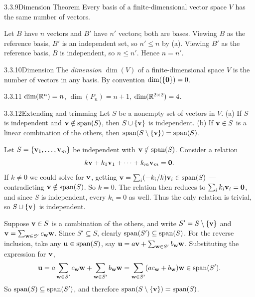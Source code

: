 \begin{thms}{3.3.9}{Dimension Theorem}
Every basis of a finite-dimensional vector space $V$ has the same number of vectors.
\end{thms}

\begin{prf}
Let $B$ have $n$ vectors and $B'$ have $n'$ vectors; both are bases. Viewing $B$ as the reference basis, $B'$ is an independent set, so $n'\le n$ by (a). Viewing $B'$ as the reference basis, $B$ is independent, so $n\le n'$. Hence $n=n'$.
\end{prf}

\begin{defns}{3.3.10}{Dimension}
The \emph{dimension} $\dim(V)$ of a finite-dimensional space $V$ is the number of vectors in any basis. By convention $\operatorname{dim}(\{\mathbf{0}\})=0$.
\end{defns}

\begin{exmp}{3.3.11}{}
$\operatorname{dim}(\mathbb{R}^n)=n$, \quad $\dim(P_n)=n+1$, \quad $\operatorname{dim}(\mathbb{R}^{2\times2})=4$.
\end{exmp}

\begin{thms}{3.3.12}{Extending and trimming}
Let $S$ be a nonempty set of vectors in $V$.
\textup{(a)} If $S$ is independent and $\mathbf{v}\notin\operatorname{span}(S)$, then $S\cup\{\mathbf{v}\}$ is independent.
\textup{(b)} If $\mathbf{v}\in S$ is a linear combination of the others, then $\operatorname{span}(S\setminus\{\mathbf{v}\})=\operatorname{span}(S)$.
\end{thms}

\begin{prf}
 Let $S=\{\mathbf{v}_1,\dots,\mathbf{v}_m\}$ be independent with $\mathbf{v}\notin\operatorname{span}(S)$. Consider a relation
\[
k\mathbf{v}+k_1\mathbf{v}_1+\cdots+k_m\mathbf{v}_m=\mathbf{0}.
\]
If $k\neq0$ we could solve for $\mathbf{v}$, getting $\mathbf{v}=\sum_i(-k_i/k)\mathbf{v}_i\in\operatorname{span}(S)$ --- contradicting $\mathbf{v}\notin\operatorname{span}(S)$. So $k=0$. The relation then reduces to $\sum_i k_i\mathbf{v}_i=\mathbf{0}$, and since $S$ is independent, every $k_i=0$ as well. Thus the only relation is trivial, so $S\cup\{\mathbf{v}\}$ is independent.

 Suppose $\mathbf{v}\in S$ is a combination of the others, and write $S'=S\setminus\{\mathbf{v}\}$ and $\mathbf{v}=\sum_{\mathbf{w}\in S'}c_{\mathbf{w}}\mathbf{w}$.
Since $S'\subseteq S$, clearly $\operatorname{span}(S')\subseteq\operatorname{span}(S)$. For the reverse inclusion, take any $\mathbf{u}\in\operatorname{span}(S)$, say $\mathbf{u}=a\mathbf{v}+\sum_{\mathbf{w}\in S'}b_{\mathbf{w}}\mathbf{w}$. Substituting the expression for $\mathbf{v}$,
\[
\mathbf{u}=a\sum_{\mathbf{w}\in S'}c_{\mathbf{w}}\mathbf{w}+\sum_{\mathbf{w}\in S'}b_{\mathbf{w}}\mathbf{w}=\sum_{\mathbf{w}\in S'}(ac_{\mathbf{w}}+b_{\mathbf{w}})\mathbf{w}\in\operatorname{span}(S').
\]
So $\operatorname{span}(S)\subseteq\operatorname{span}(S')$, and therefore $\operatorname{span}(S\setminus\{\mathbf{v}\})=\operatorname{span}(S)$.
\end{prf}

